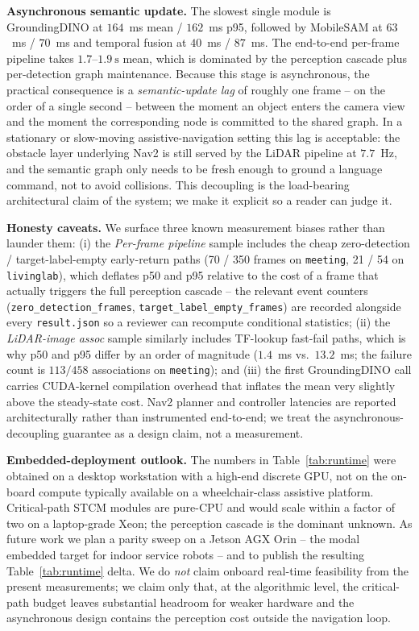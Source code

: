 \noindent\textbf{Asynchronous semantic update.}
The slowest single module is GroundingDINO at
$164$~ms mean / $162$~ms p95, followed by MobileSAM at $63$~ms / $70$~ms
and temporal fusion at $40$~ms / $87$~ms. The end-to-end per-frame
pipeline takes $1.7$--$1.9~\mathrm{s}$ mean, which is dominated by
the perception cascade plus per-detection graph maintenance. Because
this stage is asynchronous, the practical consequence is a
\emph{semantic-update lag} of roughly one frame -- on the order of a
single second -- between the moment an object enters the camera
view and the moment the corresponding node is committed to the
shared graph. In a stationary or slow-moving assistive-navigation
setting this lag is acceptable: the obstacle layer underlying Nav2
is still served by the LiDAR pipeline at $7.7$~Hz, and the
semantic graph only needs to be fresh enough to ground a
language command, not to avoid collisions. This decoupling is the
load-bearing architectural claim of the system; we make it
explicit so a reader can judge it.

\noindent\textbf{Honesty caveats.}
We surface three known measurement biases rather than launder them:
(i) the \emph{Per-frame pipeline} sample includes the cheap
zero-detection / target-label-empty early-return paths
(70 / 350 frames on \texttt{meeting}, 21 / 54 on \texttt{livinglab}),
which deflates p50 and p95 relative to the cost of a frame that
actually triggers the full perception cascade -- the relevant event
counters (\texttt{zero\_detection\_frames},
\texttt{target\_label\_empty\_frames}) are recorded alongside every
\texttt{result.json} so a reviewer can recompute conditional
statistics; (ii) the \emph{LiDAR-image assoc} sample similarly
includes TF-lookup fast-fail paths, which is why p50 and p95 differ
by an order of magnitude
($1.4$~ms vs.\ $13.2$~ms; the failure count is
$113 / 458$ associations on \texttt{meeting}); and (iii) the first
GroundingDINO call carries CUDA-kernel compilation overhead that
inflates the mean very slightly above the steady-state cost. Nav2
planner and controller latencies are reported architecturally rather
than instrumented end-to-end; we treat the asynchronous-decoupling
guarantee as a design claim, not a measurement.

\noindent\textbf{Embedded-deployment outlook.}
The numbers in Table~\ref{tab:runtime} were obtained on a desktop
workstation with a high-end discrete GPU, not on the on-board
compute typically available on a wheelchair-class assistive
platform. Critical-path STCM modules are pure-CPU and would scale
within a factor of two on a laptop-grade Xeon; the perception
cascade is the dominant unknown. As future work we plan a parity
sweep on a Jetson AGX Orin -- the modal embedded target for indoor
service robots -- and to publish the resulting Table~\ref{tab:runtime}
delta. We do \emph{not} claim onboard real-time feasibility from
the present measurements; we claim only that, at the algorithmic
level, the critical-path budget leaves substantial headroom for
weaker hardware and the asynchronous design contains the perception
cost outside the navigation loop.


